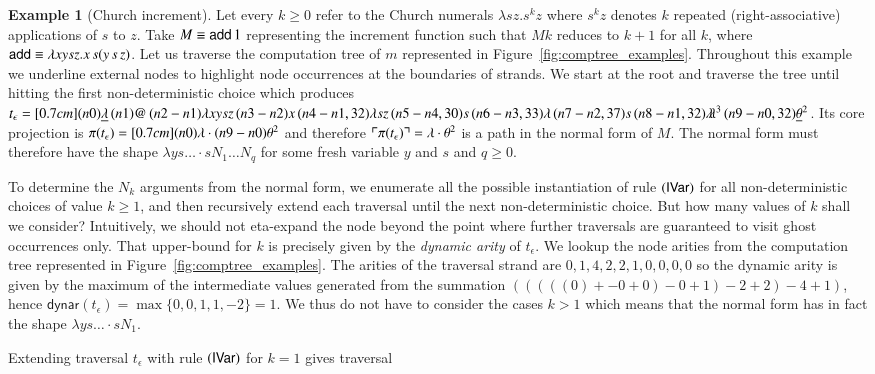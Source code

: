 \documentclass{elsarticle}
\theoremstyle{plain}
\theoremstyle{definition}
\newtheorem{example}{Example}[section]
\theoremstyle{remark}
\newcommand{\ghostlmd}{{\lambda\!\!\lambda}}
\newcommand{\ghostvar}{\theta}
\def\coresymbol{\pi} %
\newcommand{\core}[1]{\coresymbol(#1)} %
\newcommand\dynar{\textsf{dynar}} %
\newcommand{\alphaequiv}{\equiv}
\begin{document}
\begin{example}[Church increment]
\label{examp:churchincrement}
Let every $k\geq0$ refer to the Church numerals $\lambda s z . s^k z$
where $s^k z$ denotes $k$ repeated (right-associative) applications of $s$ to $z$.
Take $M \alphaequiv {\sf add}\, 1$ representing the increment function such that $M k$ reduces to $k+1$ for all $k$, where ${\sf add} \alphaequiv \lambda x y s z. x\, s (y\, s\, z)$.
Let us traverse the computation tree of $m$ represented in Figure~\ref{fig:comptree_examples}. Throughout this example we underline external nodes to highlight node occurrences at the boundaries of strands.
We start at the root and traverse the tree until hitting the first non-deterministic choice which produces
$t_\epsilon = \Pstr[0.7cm]{(n0){\underline\lambda }\,(n1){@}\,(n2-n1){\lambda x y s z}\,(n3-n2){x}\,(n4-n1,32){\lambda s z}\,(n5-n4,30){s}\,(n6-n3,33){\lambda }\,(n7-n2,37){s}\,(n8-n1,32){\ghostlmd^3}\,(n9-n0,32){\underline{\ghostvar}^2} }$. Its core projection is
$\core{t_\epsilon} = \Pstr[0.7cm]{(n0){\lambda} \cdot (n9-n0){{\ghostvar^2}} }$
and therefore $\pview{\core{t_\epsilon}} = \lambda\cdot \ghostvar^2$ is a path in the normal form of $M$.
The normal form must therefore have the shape $\lambda y s \ldots \cdot s N_1 \ldots N_q$ for some fresh variable $y$ and $s$ and $q\geq0$.

To determine the $N_k$ arguments from the normal form, we enumerate all the possible instantiation of rule $\mathbf{({\sf IVar})}$ for all non-deterministic choices of value $k\geq 1$, and then recursively extend each traversal until the next non-deterministic choice. But how many values of $k$ shall we consider? Intuitively, we should not eta-expand the node beyond the point where further traversals are guaranteed to visit ghost occurrences only. That upper-bound for $k$ is precisely given by the \emph{dynamic arity} of $t_\epsilon$.
We lookup the node arities from the computation tree represented in Figure~\ref{fig:comptree_examples}. The arities of the traversal strand are
 $0,1,4,2,2,1,0,0,0,0$ so the dynamic arity is given by the maximum of the intermediate values generated from the summation $(((((0) + -0+0) -0 +1) -2 + 2) -4 +1)$, hence $\dynar(t_\epsilon) = \max \{ 0,0,1,1,-2 \} = 1$.
 We thus do not have to consider the cases $k>1$ which means that the normal form has in fact the shape $\lambda y s \ldots \cdot s N_1$.

Extending traversal $t_\epsilon$ with rule $\mathbf{({\sf IVar})}$ for $k=1$ gives traversal


\end{example}
\end{document}
